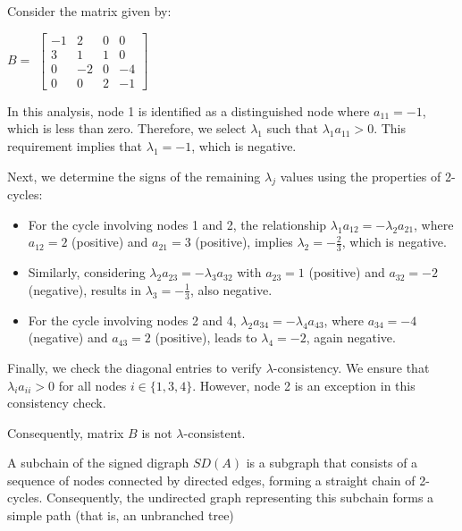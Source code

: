  \begin{example}
 		Consider the matrix given by:
 	\begin{center}
 		$ B =$ 
 		$	\begin{bmatrix}
 			-1 & 2 & 0 & 0\\
 			3 & 1 & 1 & 0\\
 			0 & -2 & 0 & -4 \\
 			0 & 0 & 2 & -1
 		\end{bmatrix}$
 	\end{center} 
	  In this analysis, node 1 is identified as a distinguished node where $a_{11} = -1$, which is less than zero. Therefore, we select $\lambda_1$ such that $\lambda_1 a_{11} > 0$. This requirement implies that $\lambda_1 = -1$, which is negative.
	  
	  Next, we determine the signs of the remaining $\lambda_j$ values using the properties of 2-cycles:
	  \begin{itemize}
	  	\item For the cycle involving nodes 1 and 2, the relationship $\lambda_1 a_{12} = -\lambda_2 a_{21}$, where $a_{12} = 2$ (positive) and $a_{21} = 3$ (positive), implies $\lambda_2 = -\frac{2}{3}$, which is negative.
	  	\item Similarly, considering $\lambda_2 a_{23} = -\lambda_3 a_{32}$ with $a_{23} = 1$ (positive) and $a_{32} = -2$ (negative), results in $\lambda_3 = -\frac{1}{3}$, also negative.
	  	\item For the cycle involving nodes 2 and 4, $\lambda_2 a_{34} = -\lambda_4 a_{43}$, where $a_{34} = -4$ (negative) and $a_{43} = 2$ (positive), leads to $\lambda_4 = -2$, again negative.
	  \end{itemize}
	  
	  Finally, we check the diagonal entries to verify $\lambda$-consistency. We ensure that $\lambda_i a_{ii} > 0$ for all nodes $i \in \{1, 3, 4\}$. However, node 2 is an exception in this consistency check.
	  
	  Consequently, matrix $B$ is not $\lambda$-consistent.
	  
 
 \end{example}

\begin{dfn}
	A subchain of the signed digraph $SD(A)$ is a subgraph that consists of a sequence of nodes connected by directed edges, forming a straight chain of 2-cycles. Consequently, the undirected graph representing this subchain forms a simple path  (that is, an unbranched tree)
	
\end{dfn}

